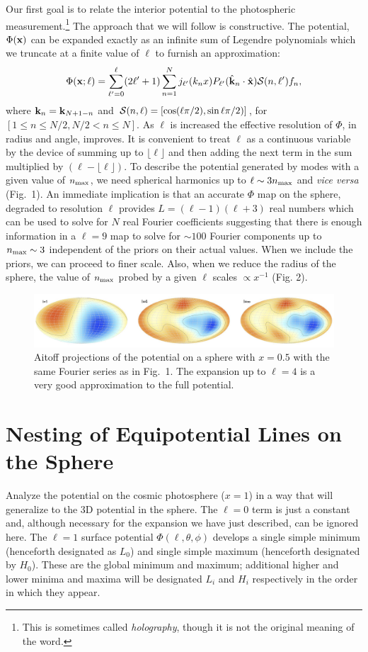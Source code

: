 \documentclass[12pt]{article}
\begin{document}
Our first goal is to relate the interior potential to the photospheric measurement.\footnote{This is sometimes called \emph{holography}, though it is not the original meaning of the word.} The approach that we will follow is constructive. The potential, $\Phi({\bf x})$ can be expanded exactly as an infinite sum of Legendre polynomials which we truncate at a finite value of $\ell$ to furnish an approximation:
\begin{equation}
\Phi({\bf x;\ell})=\sum_{\ell'=0} ^\ell(2\ell'+1)\sum_{n=1}^Nj_{\ell'}(k_nx)P_{\ell'}({\hat{\bf k}}_n\cdot{\hat{\bf x}}){\cal S}(n,\ell')f_n,
\end{equation}
where ${\bf k}_n={\bf k}_{N+1-n}$ and ${\cal S}(n,\ell)=[\cos(\ell\pi/2),\sin\ell\pi/2)]$, for $[1\le n\le N/2,N/2<n\le N]$. As $\ell$ is increased the effective resolution of $\Phi$, in radius and angle, improves. It is convenient to treat $\ell$ as a continuous variable by the device of summing up to $\lfloor\ell\rfloor$  and then adding the next term in the sum multiplied by $(\ell-\lfloor\ell\rfloor)$. To describe the potential generated by modes with a given value of $n_{\rm max}$, we need spherical harmonics up to $\ell\sim3n_{\rm max}$ and {\it vice versa} (Fig.~1). An immediate implication is that an accurate $\Phi$ map on the sphere, degraded to resolution $\ell$ provides $L=(\ell-1)(\ell+3)$ real numbers which can be used to solve for $N$ real Fourier coefficients suggesting that there is enough information in a $\ell=9$ map to solve for $\sim100$ Fourier components up to $n_{\rm max}\sim3$ independent of the priors on their actual values. When we include the priors, we can proceed to finer scale. Also, when we reduce the radius of the sphere, the value of $n_{\rm max}$  probed by a given $\ell$ scales $\propto x^{-1}$ (Fig. 2).

\begin{figure}[h!]
\centering
\includegraphics[width=6in]{fig2.jpg} 
\caption{Aitoff projections of the potential on a sphere with $x=0.5$ with the same Fourier series as in Fig.~1. The expansion up to $\ell=4$ is a very good approximation to the full potential.}
\end{figure}

\section{Nesting of Equipotential Lines on the Sphere}
Analyze the potential on the cosmic photosphere ($x=1$) in a way that will generalize to the 3D potential in the sphere. The $\ell=0$ term is just a constant and, although necessary for the expansion we have just described, can be ignored here.  The $\ell=1$ surface potential $\Phi(\ell,\theta,\phi)$ develops a single simple minimum (henceforth designated as $L_0$) and single simple maximum (henceforth designated by $H_0$). These are the global  minimum and maximum; additional higher and lower minima and maxima will be designated $L_i$ and $H_i$ respectively in the order in which they appear.
\end{document}
